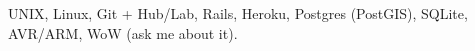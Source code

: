 \item[Systems:] UNIX, Linux, Git + Hub/Lab, Rails, Heroku, Postgres (PostGIS),
SQLite, AVR/ARM, WoW (ask me about it).
